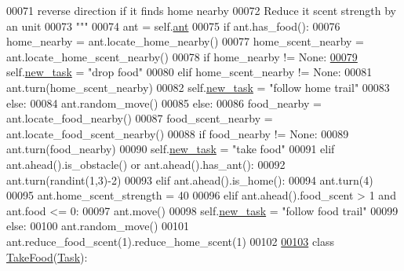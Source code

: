 \begin{DoxyCode}
00071 \textcolor{stringliteral}{             reverse direction if it finds home nearby}
00072 \textcolor{stringliteral}{         Reduce it scent strength by an unit}
00073 \textcolor{stringliteral}{        """}
00074         ant = self.\hyperlink{classtask__manager_1_1Task_ac43e25887825a1bb6e3d4a5a049968be}{ant}
00075         \textcolor{keywordflow}{if} ant.has\_food():
00076             home\_nearby = ant.locate\_home\_nearby()
00077             home\_scent\_nearby = ant.locate\_home\_scent\_nearby()
00078             \textcolor{keywordflow}{if} home\_nearby != \textcolor{keywordtype}{None}:
\hypertarget{task__manager_8py_source_l00079}{}\hyperlink{classtask__manager_1_1Explore_ab1f83ac00c442f8eedd1403a59e74060}{00079}                 self.\hyperlink{classtask__manager_1_1Task_af16658f4c3c447e24f73ed3d1803e058}{new\_task} = \textcolor{stringliteral}{"drop food"}
00080             \textcolor{keywordflow}{elif} home\_scent\_nearby != \textcolor{keywordtype}{None}:
00081                 ant.turn(home\_scent\_nearby)
00082                 self.\hyperlink{classtask__manager_1_1Task_af16658f4c3c447e24f73ed3d1803e058}{new\_task} = \textcolor{stringliteral}{"follow home trail"}
00083             \textcolor{keywordflow}{else}:
00084                 ant.random\_move()
00085         \textcolor{keywordflow}{else}:
00086             food\_nearby = ant.locate\_food\_nearby()
00087             food\_scent\_nearby = ant.locate\_food\_scent\_nearby()
00088             \textcolor{keywordflow}{if} food\_nearby != \textcolor{keywordtype}{None}:
00089                 ant.turn(food\_nearby)
00090                 self.\hyperlink{classtask__manager_1_1Task_af16658f4c3c447e24f73ed3d1803e058}{new\_task} = \textcolor{stringliteral}{"take food"}
00091             \textcolor{keywordflow}{elif} ant.ahead().is\_obstacle() \textcolor{keywordflow}{or} ant.ahead().has\_ant():
00092                 ant.turn(randint(1,3)-2)
00093             \textcolor{keywordflow}{elif} ant.ahead().is\_home():
00094                 ant.turn(4)
00095                 ant.home\_scent\_strength = 40
00096             \textcolor{keywordflow}{elif} ant.ahead().food\_scent > 1 \textcolor{keywordflow}{and} ant.food <= 0:
00097                 ant.move()
00098                 self.\hyperlink{classtask__manager_1_1Task_af16658f4c3c447e24f73ed3d1803e058}{new\_task} = \textcolor{stringliteral}{"follow food trail"}
00099             \textcolor{keywordflow}{else}:
00100                 ant.random\_move()
00101         ant.reduce\_food\_scent(1).reduce\_home\_scent(1)
00102 
\hypertarget{task__manager_8py_source_l00103}{}\hyperlink{classtask__manager_1_1TakeFood}{00103} \textcolor{keyword}{class }\hyperlink{classtask__manager_1_1TakeFood}{TakeFood}(\hyperlink{classtask__manager_1_1Task}{Task}):

\end{DoxyCode}

